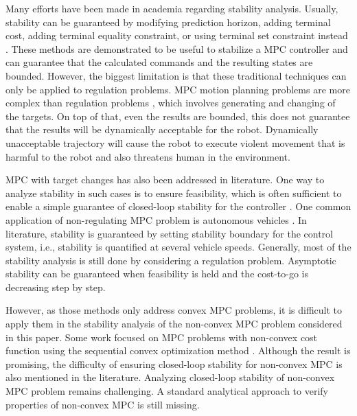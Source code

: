 \documentclass[letterpaper, 10 pt, conference]{ieeeconf}  %
\begin{document}
Many efforts have been made in academia regarding stability analysis. Usually, stability can be guaranteed by modifying prediction horizon, adding terminal cost, adding terminal equality constraint, or using terminal set constraint instead \cite{mayne2000constrained}. These methods are demonstrated to be useful to stabilize a MPC controller and can guarantee that the calculated commands and the resulting states are bounded. However, the biggest limitation is that these traditional techniques can only be applied to regulation problems. MPC motion planning problems are more complex than regulation problems \cite{limon2006stability}, which involves generating and changing of the targets. On top of that,
even the results are bounded, this does not guarantee that the results will be dynamically acceptable for the robot. Dynamically unacceptable trajectory will cause the robot to execute violent movement that is harmful to the robot and also threatens human in the environment.  

MPC with target changes has also been addressed in literature. One way to analyze stability in such cases is to ensure feasibility, which is often sufficient to enable a simple guarantee of closed-loop stability for the controller \cite{boccia2014stability}\cite{dughman2015survey}\cite{zhang2016switched}. One common application of non-regulating MPC problem is autonomous vehicles \cite{mejari2014stabilization}. In literature, stability is guaranteed by setting stability boundary for the control system, i.e., stability is quantified at several vehicle speeds. Generally, most of the stability analysis is still done by considering a regulation problem. Asymptotic stability can be guaranteed when feasibility is held and the cost-to-go is decreasing step by step.

However, as those methods only address convex MPC problems, it is difficult to apply them in the stability analysis of the non-convex MPC problem considered in this paper. Some work focused on MPC problems with non-convex cost function using the sequential convex optimization method \cite{hovgaard2013nonconvex}. Although the result is promising, the difficulty of ensuring closed-loop stability for non-convex MPC is also mentioned in the literature. 
Analyzing closed-loop stability of non-convex MPC problem remains challenging. A standard analytical approach to verify properties of non-convex MPC is still missing.
\end{document}
